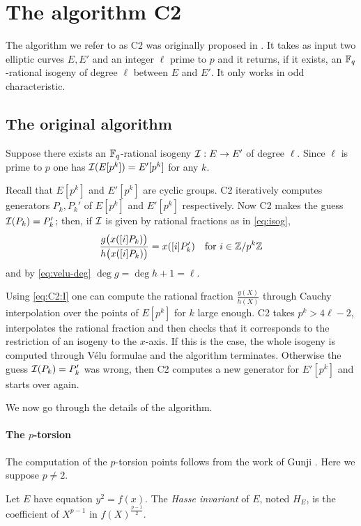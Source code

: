 \section{The algorithm C2}
\label{sec:C2}

The algorithm we refer to as C2 was originally proposed in
\cite{Cou96}. It takes as input two elliptic curves $E, E'$ and an
integer $\ell$ prime to $p$ and it returns, if it exists, an
$\mathbb{F}_q$-rational isogeny of degree $\ell$ between $E$ and $E'$. It only
works in odd characteristic.

\subsection{The original algorithm}
Suppose there exists an $\mathbb{F}_q$-rational isogeny
$\mathcal{I}:E\rightarrow E'$ of degree $\ell$. Since $\ell$ is prime to $p$
one has $\mathcal{I}(E[p^k]) = E'[p^k]$ for any $k$.

Recall that $E[p^k]$ and $E'[p^k]$ are cyclic groups. C2 iteratively
computes generators $P_k,P_k'$ of $E[p^k]$ and $E'[p^k]$
respectively. Now C2 makes the guess $\mathcal{I}(P_k) = P_k'$; then, if $\mathcal{I}$
is given by rational fractions as in \eqref{eq:isog},
\begin{equation}
  \label{eq:C2:I}
  \frac{g\bigl(x([i]P_k)\bigr)}{h\bigl(x([i]P_k)\bigr)} = x([i]P_k')
  \quad\text{for $i\in\mathbb{Z}/p^k\mathbb{Z}$} 
\end{equation}
and by \eqref{eq:velu-deg} $\deg g = \deg h + 1 = \ell$.

Using \eqref{eq:C2:I} one can compute the rational fraction
$\frac{g(X)}{h(X)}$ through Cauchy interpolation over the points of
$E[p^k]$ for $k$ large enough. C2 takes $p^k > 4\ell - 2$,
interpolates the rational fraction and then checks that it corresponds
to the restriction of an isogeny to the $x$-axis. If this is the case,
the whole isogeny is computed through Vélu formulae and the algorithm
terminates. Otherwise the guess $\mathcal{I}(P_k) = P_k'$ was wrong, then C2
computes a new generator for $E'[p^k]$ and starts over again.

We now go through the details of the algorithm.

\paragraph{The $p$-torsion}
The computation of the $p$-torsion points follows from the work of
Gunji \cite{Gun76}. Here we suppose $p\ne2$.

\begin{definition}
  \label{def:hasse}
  Let $E$ have equation $y^2 = f(x)$. The \emph{Hasse invariant} of
  $E$, noted $H_E$, is the coefficient of $X^{p-1}$ in
  $f(X)^{\frac{p-1}{2}}$.
\end{definition}

